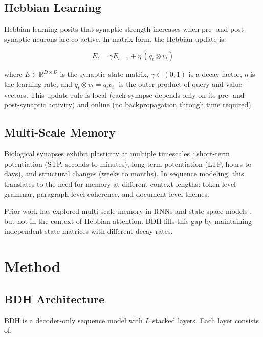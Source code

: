 \documentclass{article}
\begin{document}
\subsection{Hebbian Learning}

Hebbian learning \citep{hebb1949organization} posits that synaptic strength increases when pre- and post-synaptic neurons are co-active. In matrix form, the Hebbian update is:

\begin{equation}
E_{t} = \gamma E_{t-1} + \eta \, (q_t \otimes v_t)
\end{equation}

where $E \in \mathbb{R}^{D \times D}$ is the synaptic state matrix, $\gamma \in (0,1)$ is a decay factor, $\eta$ is the learning rate, and $q_t \otimes v_t = q_t v_t^\top$ is the outer product of query and value vectors. This update rule is local (each synapse depends only on its pre- and post-synaptic activity) and online (no backpropagation through time required).

\subsection{Multi-Scale Memory}

Biological synapses exhibit plasticity at multiple timescales \citep{abbott2000synaptic}: short-term potentiation (STP, seconds to minutes), long-term potentiation (LTP, hours to days), and structural changes (weeks to months). In sequence modeling, this translates to the need for memory at different context lengths: token-level grammar, paragraph-level coherence, and document-level themes.

Prior work has explored multi-scale memory in RNNs \citep{mujika2017fast-slow} and state-space models \citep{gu2023mamba}, but not in the context of Hebbian attention. BDH fills this gap by maintaining independent state matrices with different decay rates.

\section{Method}

\subsection{BDH Architecture}

BDH is a decoder-only sequence model with $L$ stacked layers. Each layer consists of:
\end{document}
